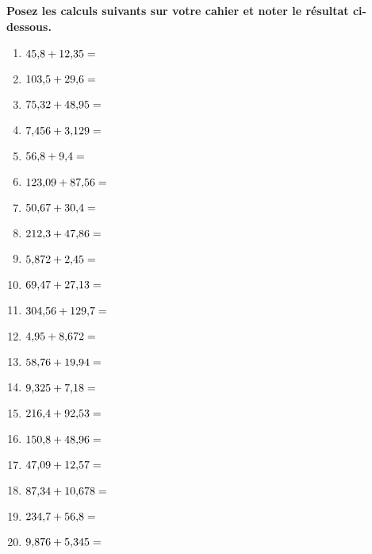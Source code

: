 \documentclass[11pt]{article}
\begin{document}
\begin{exercice}
\textbf{Posez les calculs suivants sur votre cahier et noter le résultat ci-dessous.}
\begin{multicols}{3}
\begin{enumerate}
   \item $45{,}8 + 12{,}35=\dotfill$
    \item $103{,}5 + 29{,}6=\dotfill$
    \item $75{,}32 + 48{,}95=\dotfill$
    \item $7{,}456 + 3{,}129=\dotfill$
    \item $56{,}8 + 9{,}4=\dotfill$
    \item $123{,}09 + 87{,}56=\dotfill$
    \item $50{,}67 + 30{,}4=\dotfill$
    \item $212{,}3 + 47{,}86=\dotfill$
    \item $5{,}872 + 2{,}45=\dotfill$
    \item $69{,}47 + 27{,}13=\dotfill$
    \item $304{,}56 + 129{,}7=\dotfill$
    \item $4{,}95 + 8{,}672=\dotfill$
    \item $58{,}76 + 19{,}94=\dotfill$
    \item $9{,}325 + 7{,}18=\dotfill$
    \item $216{,}4 + 92{,}53=\dotfill$
    \item $150{,}8 + 48{,}96=\dotfill$
    \item $47{,}09 + 12{,}57=\dotfill$
    \item $87{,}34 + 10{,}678=\dotfill$
    \item $234{,}7 + 56{,}8=\dotfill$
    \item $9{,}876 + 5{,}345=\dotfill$
\end{enumerate}
\end{multicols}
\end{exercice}
\end{document}
